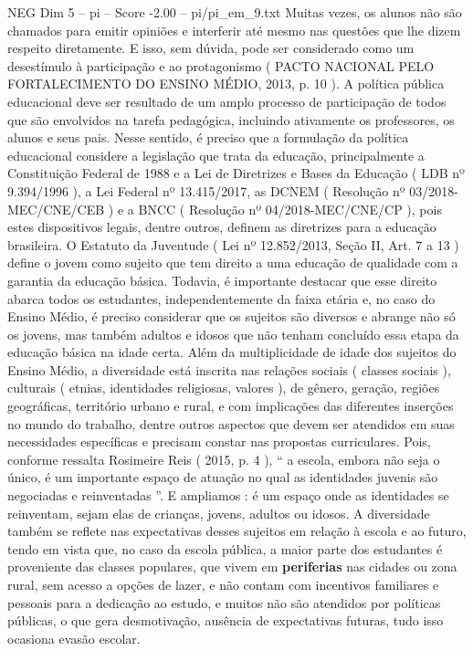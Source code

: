 \begin{textsample}{NEG Dim 5 – pi – Score -2.00 – pi/pi\_em\_9.txt}
Muitas vezes, os alunos não são chamados para emitir opiniões e interferir até mesmo nas questões que lhe dizem respeito diretamente.
E isso, sem dúvida, pode ser considerado como um desestímulo à participação e ao protagonismo ( PACTO NACIONAL PELO FORTALECIMENTO DO ENSINO MÉDIO, 2013, p. 10 ).
A política pública educacional deve ser resultado de um amplo processo de participação de todos que são envolvidos na tarefa pedagógica, incluindo ativamente os professores, os alunos e seus pais.
Nesse sentido, é preciso que a formulação da política educacional considere a legislação que trata da educação, principalmente a Constituição Federal de 1988 e a Lei de Diretrizes e Bases da Educação ( LDB nº 9.394/1996 ), a Lei Federal nº 13.415/2017, as DCNEM ( Resolução nº 03/2018-MEC/CNE/CEB ) e a BNCC ( Resolução nº 04/2018-MEC/CNE/CP ), pois estes dispositivos legais, dentre outros, definem as diretrizes para a educação brasileira.
O Estatuto da Juventude ( Lei nº 12.852/2013, Seção II, Art. 7 a 13 ) define o jovem como sujeito que tem direito a uma educação de qualidade com a garantia da educação básica.
Todavia, é importante destacar que esse direito abarca todos os estudantes, independentemente da faixa etária e, no caso do Ensino Médio, é preciso considerar que os sujeitos são diversos e abrange não só os jovens, mas também adultos e idosos que não tenham concluído essa etapa da educação básica na idade certa.
Além da multiplicidade de idade dos sujeitos do Ensino Médio, a diversidade está inscrita nas relações sociais ( classes sociais ), culturais ( etnias, identidades religiosas, valores ), de gênero, geração, regiões geográficas, território urbano e rural, e com implicações das diferentes inserções no mundo do trabalho, dentre outros aspectos que devem ser atendidos em suas necessidades específicas e precisam constar nas propostas curriculares.
Pois, conforme ressalta Rosimeire Reis ( 2015, p. 4 ), “ a escola, embora não seja o único, é um importante espaço de atuação no qual as identidades juvenis são negociadas e reinventadas ”.
E ampliamos : é um espaço onde as identidades se reinventam, sejam elas de crianças, jovens, adultos ou idosos.
A diversidade também se reflete nas expectativas desses sujeitos em relação à escola e ao futuro, tendo em vista que, no caso da escola pública, a maior parte dos estudantes é proveniente das classes populares, que vivem em \textbf{periferias} nas cidades ou zona rural, sem acesso a opções de lazer, e não contam com incentivos familiares e pessoais para a dedicação ao estudo, e muitos não são atendidos por políticas públicas, o que gera desmotivação, ausência de expectativas futuras, tudo isso ocasiona evasão escolar.

\end{textsample}
